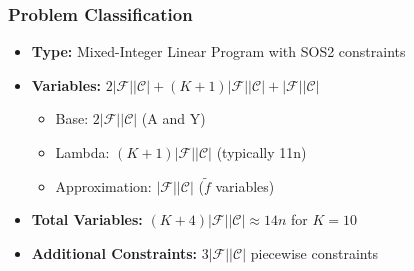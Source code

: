 \documentclass{article}
\begin{document}
\subsubsection{Problem Classification}
\begin{itemize}
    \item \textbf{Type:} Mixed-Integer Linear Program with SOS2 constraints
    \item \textbf{Variables:} $2|\mathcal{F}||\mathcal{C}| + (K+1)|\mathcal{F}||\mathcal{C}| + |\mathcal{F}||\mathcal{C}|$
    \begin{itemize}
        \item Base: $2|\mathcal{F}||\mathcal{C}|$ (A and Y)
        \item Lambda: $(K+1)|\mathcal{F}||\mathcal{C}|$ (typically 11n)
        \item Approximation: $|\mathcal{F}||\mathcal{C}|$ ($\tilde{f}$ variables)
    \end{itemize}
    \item \textbf{Total Variables:} $(K+4)|\mathcal{F}||\mathcal{C}| \approx 14n$ for $K=10$
    \item \textbf{Additional Constraints:} $3|\mathcal{F}||\mathcal{C}|$ piecewise constraints
\end{itemize}



\end{document}
